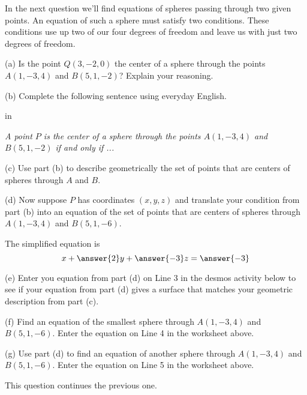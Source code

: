\documentclass{ximera}
\newcommand{\pskip}{\vskip 0.1 in}
\begin{document}
In the next question we'll find equations of spheres passing through two given points. An equation of such a sphere must satisfy two conditions. These conditions use up two of our four degrees of freedom and leave us with just two degrees of freedom.  

\begin{question}   \label{Q5453466366}
\begin{freeResponse}
(a) Is the point $Q(3,-2,0)$ the center of a sphere through the points $A(1,-3,4)$ and $B(5,1,-2)$? Explain your reasoning.

(b) Complete the following sentence using everyday English.

\pskip

\emph{A point $P$ is the center of a sphere through the points $A(1,-3,4)$ and $B(5,1,-2)$ if and only if ...}

(c) Use part (b) to describe geometrically the set of points that are centers of spheres through $A$ and $B$.

\end{freeResponse}

(d) Now suppose $P$ has coordinates $(x,y,z)$ and translate your condition from part (b) into an equation of the set of points that are centers of spheres through $A(1,-3,4)$ and $B(5,1,-6)$. 

The simplified equation is 
\[
       x + \answer{2}y + \answer{-3}z = \answer{-3}
\]

(e) Enter you equation from part (d) on Line 3 in the desmos activity below to see if your equation from part (d) gives a surface that matches your geometric description from part (c).


\begin{onlineOnly}
    \begin{center}
\end{center}
\end{onlineOnly}


(f) Find an equation of the smallest sphere through $A(1,-3,4)$ and $B(5,1,-6)$. Enter the equation on Line 4 in the worksheet above.

(g) Use part (d) to find an equation of another sphere through $A(1,-3,4)$ and $B(5,1,-6)$. Enter the equation on Line 5 in the worksheet above.

\end{question}


\begin{question}  \label{Q2231324ffh}
This question continues the previous one. 
\end{question}
\end{document}

